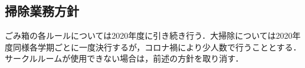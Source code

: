 \subsection*{掃除業務方針}


ごみ箱の各ルールについては2020年度に引き続き行う．大掃除については2020年度同様各学期ごとに一度決行するが，コロナ禍により少人数で行うこととする．サークルルームが使用できない場合は，前述の方針を取り消す．
